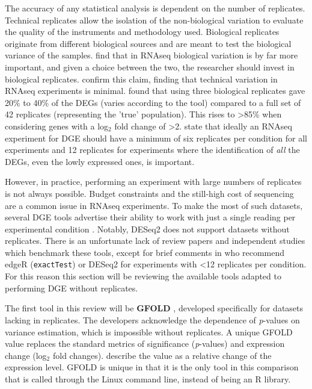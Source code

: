 The accuracy of any statistical analysis is dependent on the number of replicates. Technical replicates allow the isolation of the non-biological variation to evaluate the quality of the instruments and methodology used. Biological replicates originate from different biological sources and are meant to test the biological variance of the samples. \cite{liu2014rna} find that in RNAseq biological variation is by far more important, and given a choice between the two, the researcher should invest in biological replicates. \cite{bullard2010evaluation} confirm this claim, finding that technical variation in RNAseq experiments is minimal. \cite{schurch2016many} found that using three biological replicates gave 20\% to 40\% of the \ac{DEG}s (varies according to the tool) compared to a full set of 42 replicates (representing the 'true' population). This rises to >85\% when considering genes with a log$_2$ fold change of >2. \cite{schurch2016many} state that ideally an RNAseq experiment for \ac{DGE} should have a minimum of six replicates per condition for all experiments and 12 replicates for experiments where the identification of \textit{all} the \ac{DEG}s, even the lowly expressed ones, is important. 

However, in practice, performing an experiment with large numbers of replicates is not always possible. Budget constraints and the still-high cost of sequencing are a common issue in RNAseq experiments. To make the most of such datasets, several \ac{DGE} tools advertise their ability to work with just a single reading per experimental condition \citep{feng2012gfold, gim2016lpeseq, anders2010differential, wang2010degseq, al2014bootstrap}. Notably, DESeq2 does not support datasets without replicates. There is an unfortunate lack of review papers and independent studies which benchmark these tools, except for brief comments in \cite{schurch2016many} who recommend edgeR (\texttt{exactTest}) or DESeq2 for experiments with <12 replicates per condition. For this reason this section will be reviewing the available tools adapted to performing \ac{DGE} without replicates.

The first tool in this review will be \textbf{GFOLD} \citep{feng2012gfold}, developed specifically for datasets lacking in replicates. The developers acknowledge the dependence of \textit{p}-values on variance estimation, which is impossible without replicates. A unique GFOLD value replaces the standard metrics of significance (\textit{p}-values) and expression change (log$_2$ fold changes). \cite{feng2012gfold} describe the value as a relative change of the expression level. GFOLD is unique in that it is the only tool in this comparison that is called through the Linux command line, instead of being an R library.

